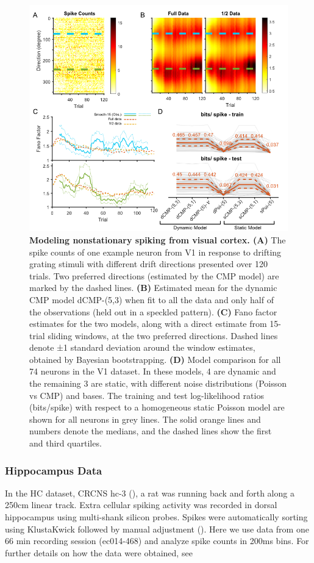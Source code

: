 \documentclass[aoas]{imsart}
\theoremstyle{plain}
\theoremstyle{remark}
\begin{document}
\begin{figure}[h!]
	\centering
	\includegraphics[width=1\textwidth]{figure4.png}
	\caption{\textbf{Modeling nonstationary spiking from visual cortex. (A)} The spike counts of one example neuron from V1 in response to drifting grating stimuli with different drift directions presented over 120 trials. Two preferred directions (estimated by the CMP model) are marked by the dashed lines. \textbf{(B)} Estimated mean for the dynamic CMP model dCMP-(5,3) when fit to all the data and only half of the observations (held out in a speckled pattern). \textbf{(C)} Fano factor estimates for the two models, along with a direct estimate from 15-trial sliding windows, at the two preferred directions. Dashed lines denote ±1 standard deviation around the window estimates, obtained by Bayesian bootstrapping. \textbf{(D)} Model comparison for all 74 neurons in the V1 dataset. In these models, 4 are dynamic and the remaining 3 are static, with different noise distributions (Poisson vs CMP) and bases. The training and test log-likelihood ratios (bits/spike) with respect to a homogeneous static Poisson model are shown for all neurons in grey lines. The solid orange lines and numbers denote the medians, and the dashed lines show the first and third quartiles.}
	\label{fig4}
\end{figure}

\subsubsection{Hippocampus Data}
In the HC dataset, CRCNS hc-3 (\cite{Mizuseki2013}), a rat was running back and forth along a 250cm linear track. Extra cellular spiking activity was recorded in dorsal hippocampus using multi-shank silicon probes. Spikes were automatically sorting using KlustaKwick followed by manual adjustment (\cite{Rossant2016}). Here we use data from one 66 min recording session (ec014-468) and analyze spike counts in 200ms bins. For further details on how the data were obtained, see \cite{Mizuseki2014}
\end{document}
